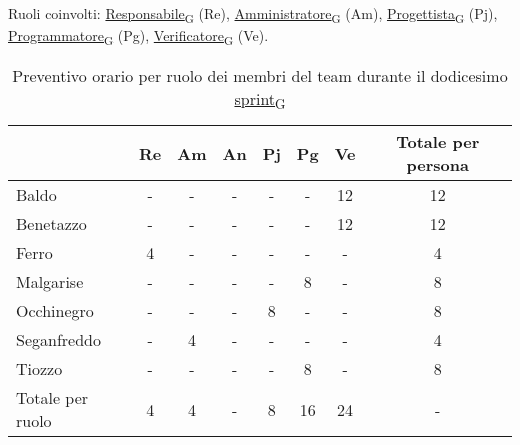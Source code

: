 \newpage
{}
Ruoli coinvolti: \href{https://7last.github.io/docs/pb/documentazione-interna/glossario\#responsabile}{Responsabile\textsubscript{G}} (Re), \href{https://7last.github.io/docs/pb/documentazione-interna/glossario\#amministratore}{Amministratore\textsubscript{G}} (Am), \href{https://7last.github.io/docs/pb/documentazione-interna/glossario\#progettista}{Progettista\textsubscript{G}} (Pj), \href{https://7last.github.io/docs/pb/documentazione-interna/glossario\#programmatore}{Programmatore\textsubscript{G}} (Pg), \href{https://7last.github.io/docs/pb/documentazione-interna/glossario\#verificatore}{Verificatore\textsubscript{G}} (Ve).
\begin{table}[!h]
    \centering
    \begin{tabular}{ | l | c | c | c | c | c | c | c | }
        \hline
        \textbf{} & \textbf{Re} & \textbf{Am} &\textbf{An} & \textbf{Pj} & \textbf{Pg} & \textbf{Ve} & \textbf{Totale per persona} \\
        \hline
        Baldo            &  -   &  -   &  -   &  -   &  -   & 12   & 12   \\
        Benetazzo        &  -   &  -   &  -   &  -   &  -   & 12   & 12   \\
        Ferro            &  4   &  -   &  -   &  -   &  -   &  -   &  4   \\
        Malgarise        &  -   &  -   &  -   &  -   &  8   &  -   &  8   \\
        Occhinegro       &  -   &  -   &  -   &  8   &  -   &  -   &  8   \\
        Seganfreddo      &  -   &  4   &  -   &  -   &  -   &  -   &  4   \\
        Tiozzo           &  -   &  -   &  -   &  -   &  8   &  -   &  8   \\
        \hline
        Totale per ruolo &  4   &  4   &  -   &  8   & 16   & 24   &  -   \\
        \hline
    \end{tabular}
    \caption{Preventivo orario per ruolo dei membri del team durante il dodicesimo \href{https://7last.github.io/docs/pb/documentazione-interna/glossario\#sprint}{sprint\textsubscript{G}}}
    
\end{table}

